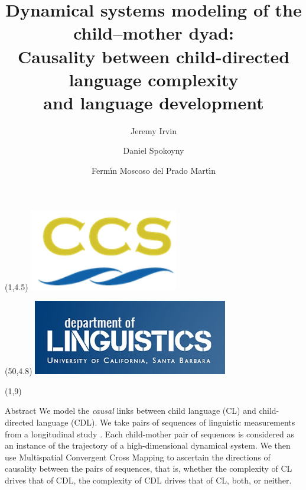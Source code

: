 \documentclass[final]{beamer}
\title{Dynamical systems modeling of the child–mother dyad:\\ \vspace{0.15em}
Causality between child-directed language complexity \\ 
\vspace{0.15em}
and language development \vspace{0.15em}}
\author[shortname]{Jeremy Irvin 
\and Daniel Spokoyny 
\and Ferm\'{\i}n Moscoso del Prado Mart\'{\i}n 
}
\date{}
\begin{document}
\begin{frame}{} 

\begin{textblock}{10}(1,4.5)
\includegraphics[width=6.5cm]{ccs.png}
\end{textblock}

\begin{textblock}{10}(50,4.8)
\includegraphics[width=8.5cm]{ling.jpg}
\end{textblock}

\begin{textblock}{22}(1,9)
\begin{block}{Abstract}
We model the \emph{causal} links between child language (CL) and child-directed language (CDL). We take pairs of sequences of linguistic measurements from a longitudinal study \cite{MacWhinney14, Theakston01}. Each child-mother pair of sequences is considered as an instance of the trajectory of a high-dimensional dynamical system. We then use Multispatial Convergent Cross Mapping \cite{Clark15} to ascertain the directions of causality between the pairs of sequences, that is, whether the complexity of CL drives that of CDL, the complexity of CDL drives that of CL, both, or neither.
\end{block}


\end{textblock}
\end{frame}
\end{document}
